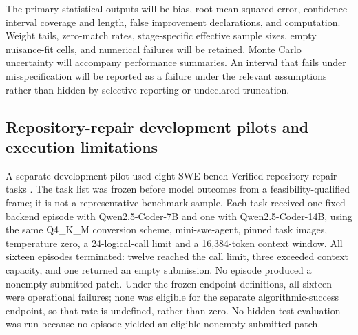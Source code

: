 The primary statistical outputs will be bias, root mean squared error, confidence-interval coverage and length, false improvement declarations, and computation. Weight tails, zero-match rates, stage-specific effective sample sizes, empty nuisance-fit cells, and numerical failures will be retained. Monte Carlo uncertainty will accompany performance summaries. An interval that fails under misspecification will be reported as a failure under the relevant assumptions rather than hidden by selective reporting or undeclared truncation.

\subsection{Repository-repair development pilots and execution limitations}
A separate development pilot used eight SWE-bench Verified repository-repair tasks
\citep{jimenez2023swebench}. The task list was frozen before model outcomes from a feasibility-qualified
frame; it is not a representative benchmark sample. Each task received one fixed-backend episode with
Qwen2.5-Coder-7B and one with Qwen2.5-Coder-14B, using the same Q4\_K\_M conversion scheme,
mini-swe-agent, pinned task images, temperature zero, a 24-logical-call limit and a 16,384-token context window.
All sixteen episodes terminated: twelve reached the call limit, three exceeded context capacity,
and one returned an empty submission. No episode produced a nonempty submitted patch.
Under the frozen endpoint definitions, all sixteen were operational failures; none was eligible for
the separate algorithmic-success endpoint, so that rate is undefined, rather than zero.
No hidden-test evaluation was run because no episode yielded an eligible nonempty submitted patch.

